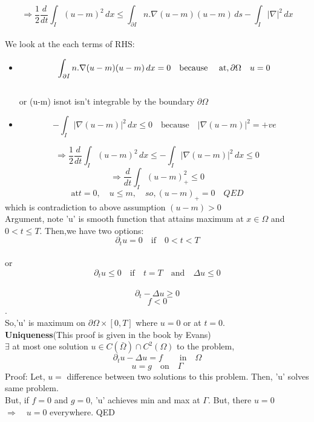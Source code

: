 \[ \Rightarrow
\frac{1}{2}\frac{d}{dt}\int_{I}(u-m)^{2}\,dx \leq \int_{\partial I} n. \nabla (u-m)(u-m)\,ds- \int_{I}|\nabla|^{2}\,dx

 \]\\
 
We look at the each terms of RHS:\\
 \begin{itemize}
     \item \[\int_{\partial I} n. \nabla(u-m)(u-m)\,dx = 0 \quad \text{because \quad at}, \partial \Omega \quad u  =0\]\\ or  (u-m) isnot isn't integrable by the boundary $\partial \Omega$\\
     \item \[-\int_{I}|\nabla(u-m)|^{2}\,dx \leq 0 \quad \text{because} \quad |\nabla(u-m)|^{2}=+ve \]
 \end{itemize}
 \[
 \Rightarrow \frac{1}{2}\frac{d}{dt} \int_{I}(u-m)^{2}\,dx \leq - \int_{I}|\nabla(u-m)|^{2}\,dx \leq 0
 \]
 \[
 \Rightarrow \frac{d}{dt}\int_{I}(u-m)_{+}^{2}\leq 0
 \]
 \[
 \text{at} t=0, \quad u\leq m, \quad so, (u-m)_{+}=0  \quad QED
 \]
 which is contradiction to above assumption $(u-m)>0$\\
 Argument, note 'u' is smooth function that attains maximum at $x \in \Omega$ and $0<t\leq T$. Then,we have two options:\\ \rightarrow  \[\partial_{t}u=0 \quad \text{if} \quad 0<t<T\]\\
 or \rightarrow \[\partial_{t}u\leq 0\quad \text{if}\quad  t=T \quad \text{and} \quad \Delta u \leq 0\]\\
 \[\partial_{t}-\Delta u \geq 0\] \quad {} \[f<0\].\\
 So,'u' \quad is \quad maximum \quad on \quad  $\partial \Omega \times [0,T]$ where $u=0$ or at $t=0$.\\

\textbf{Uniqueness}\quad (This proof is given in the book by Evans)\\
$\exists$ at most one solution $u \in C(\bar\Omega)\cap C^{2}(\Omega)$ to the problem,\\
\[\partial_{t}u-\Delta u=f \qquad \text{in} \quad \Omega \]
\[u=g \quad \text{on} \quad  \Gamma \]
 Proof: Let, $u=$ difference between two solutions to this problem. Then, 'u' solves same problem. \\But, if
 $f=0$ and $ g=0$, 'u' achieves min and max at $\Gamma$. But, there $u=0$ $\Rightarrow \quad u=0$ everywhere. \quad QED\\
 
